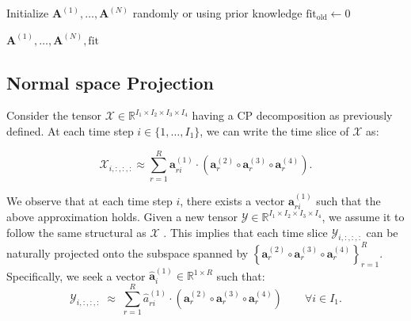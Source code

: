 \documentclass{ieeeaccess}
\begin{document}
\begin{algorithm}[H]
\caption{CP Decomposition using ALS }

Initialize $\mathbf{A}^{(1)}, \ldots, \mathbf{A}^{(N)}$ randomly or using prior knowledge\;
$\text{fit}_{\text{old}} \gets 0$\;

\Return $\mathbf{A}^{(1)}, \ldots, \mathbf{A}^{(N)}, \text{fit}$\;
\end{algorithm}



\subsection{Normal space Projection}
Consider the tensor \(\mathcal{X} \in \mathbb{R}^{I_1 \times I_2 \times I_3 \times I_4}\) having a CP decomposition as previously defined. At each time step \(i \in \{1, \dots, I_1\}\), we can write the time slice of \(\mathcal{X}\) as:

\begin{equation}
\mathcal{X}_{i,:,:,:} \approx \sum_{r=1}^{R} \mathbf{a}_{ri}^{(1)} \cdot \left( \mathbf{a}_r^{(2)} \circ \mathbf{a}_r^{(3)} \circ \mathbf{a}_r^{(4)} \right).
\end{equation}

\noindent We observe that at each time step \(i\), there exists a vector \(\mathbf{a}_{ri}^{(1)}\) such that the above approximation holds. Given a new tensor \(\mathcal{Y} \in \mathbb{R}^{I_1 \times I_2 \times I_3 \times I_4}\), we assume it to follow the same structural as \(\mathcal{X}\)  . This implies that each time slice \(\mathcal{Y}_{i,:,:,:}\) can be naturally projected onto the subspace spanned by \(\left\{\mathbf{a}_r^{(2)} \circ \mathbf{a}_r^{(3)} \circ \mathbf{a}_r^{(4)}  \right\}_{r=1}^{R}
\). Specifically, we seek a vector \(\hat{\mathbf{a}}_{i}^{(1)} \in \mathbb{R}^{1 \times R}\) such that:
\begin{equation}
\mathcal{Y}_{i,:,:,:} \;\approx\; 
\sum_{r=1}^{R} \hat{a}^{(1)}_{ri} \cdot 
\left( \mathbf{a}_r^{(2)} \circ \mathbf{a}_r^{(3)} \circ \mathbf{a}_r^{(4)} \right)
\qquad \forall i \in I_1.
\end{equation}
\end{document}
